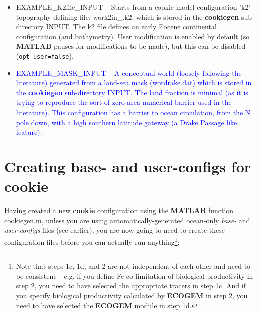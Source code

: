 \begin{itemize}[noitemsep]
\vspace{1mm}
\item \textsf{\footnotesize EXAMPLE\_K2file\_INPUT} -- Starts from a cookie model configuration 'k2' topography defining file: \textsf{\footnotesize work2in\_.k2}, which is stored in the \textbf{cookiegen} sub-directory \textsf{\footnotesize INPUT}. The k2 file defines an early Eocene continental configuration (and bathymetry). User modification is enabled by default (so \textbf{MATLAB} pauses for modifications to be made), but this can be disabled (\texttt{opt\_user=false}).

\vspace{1mm}
\item \textcolor{blue}{\textsf{\footnotesize EXAMPLE\_MASK\_INPUT} -- A conceptual world (loosely following the literature) generated from a land-sea mask (\textsf{\footnotesize wordrake.dat}) which is stored in the \textbf{cookiegen} sub-directory \textsf{\footnotesize INPUT}. The land fraction is minimal (as it is trying to reproduce the sort of zero-area numerical barrier used in the literature). This configuration has a barrier to ocean circulation, from the N pole down, with a high southern latitude gateway (a Drake Passage like feature).}

\end{itemize}

\newpage

\section{Creating base- and user-configs for cookie}\label{sec:configuring_cookie_experiments}


Having created a new \textbf{cookie} configuration using the \textbf{MATLAB} function \textsf{\footnotesize cookiegen.m}, unless you are using automatically-generated ocean-only \textit{base-} and \textit{user-configs} files (see earlier), you are now going to need to create these configuration files before you can actually run anything\footnote{Note that steps 1c, 1d, and 2 are not independent of each other and need to be consistent -- e.g. if you define Fe co-limitation of biological productivity in step 2, you need to have selected the appropriate tracers in step 1c. And if you specify biological productivity calculated by \textbf{ECOGEM} in step 2, you need to have selected the \textbf{ECOGEM} module in step 1d.}:

